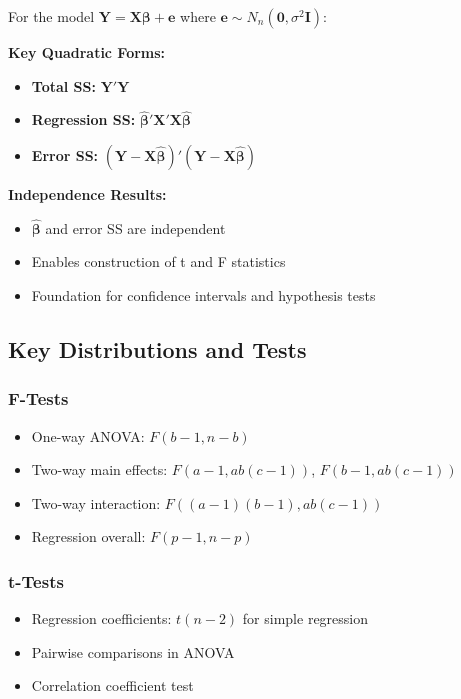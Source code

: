 For the model $\mathbf{Y} = \mathbf{X}\boldsymbol{\beta} + \mathbf{e}$ where $\mathbf{e} \sim N_n(\mathbf{0}, \sigma^2\mathbf{I})$:

\textbf{Key Quadratic Forms:}

\begin{itemize}
	\item \textbf{Total SS:} $\mathbf{Y}'\mathbf{Y}$
	\item \textbf{Regression SS:} $\hat{\boldsymbol{\beta}}'\mathbf{X}'\mathbf{X}\hat{\boldsymbol{\beta}}$
	\item \textbf{Error SS:} $(\mathbf{Y} - \mathbf{X}\hat{\boldsymbol{\beta}})'(\mathbf{Y} - \mathbf{X}\hat{\boldsymbol{\beta}})$
\end{itemize}

\textbf{Independence Results:}

\begin{itemize}
	\item $\hat{\boldsymbol{\beta}}$ and error SS are independent
	\item Enables construction of t and F statistics
	\item Foundation for confidence intervals and hypothesis tests
\end{itemize}

\subsection{Key Distributions and Tests}

\subsubsection{F-Tests}

\begin{itemize}
	\item One-way ANOVA: $F(b-1, n-b)$
	\item Two-way main effects: $F(a-1, ab(c-1))$, $F(b-1, ab(c-1))$
	\item Two-way interaction: $F((a-1)(b-1), ab(c-1))$
	\item Regression overall: $F(p-1, n-p)$
\end{itemize}

\subsubsection{t-Tests}

\begin{itemize}
	\item Regression coefficients: $t(n-2)$ for simple regression
	\item Pairwise comparisons in ANOVA
	\item Correlation coefficient test
\end{itemize}

